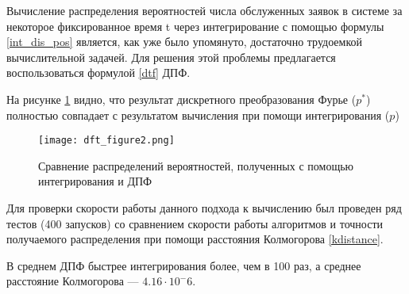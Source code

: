Вычисление распределения вероятностей числа обслуженных заявок в системе за некоторое фиксированное время t через интегрирование с помощью формулы \eqref{int_dis_pos} является, как уже было упомянуто, достаточно трудоемкой вычислительной задачей. Для решения этой проблемы предлагается воспользоваться формулой \eqref{dtf} ДПФ.

На рисунке \ref{dft_figure2z} видно, что результат дискретного преобразования Фурье ($p^*$) полностью совпадает с результатом вычисления при помощи интегрирования ($p$)
\begin{figure}[H]
	\centering
	\texttt{[image: dft\_figure2.png]}
	\caption{Сравнение распределений вероятностей, полученных с помощью интегрирования и ДПФ}
	\label{dft_figure2z}
\end{figure}

Для проверки скорости работы данного подхода к вычислению был проведен ряд тестов (400 запусков) со сравнением скорости работы алгоритмов и точности получаемого распределения при помощи расстояния Колмогорова \eqref{kdistance}.

В среднем ДПФ быстрее интегрирования более, чем в 100 раз, а среднее расстояние Колмогорова --- $4.16 \cdot 10^-6$.


\clearpage

